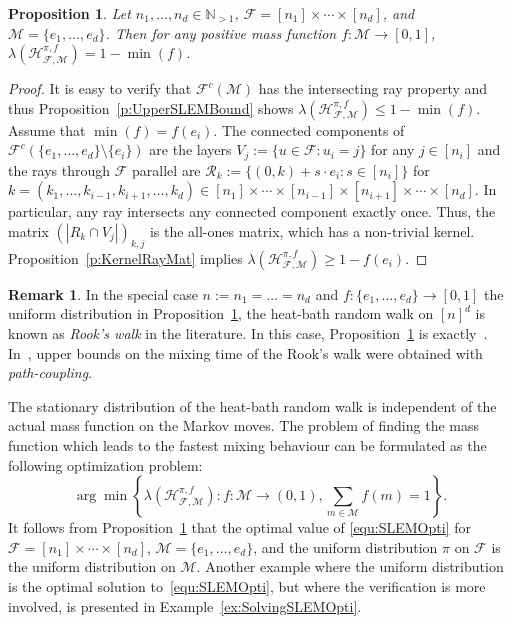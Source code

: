 \documentclass[11pt]{amsart}
\newtheorem{prop}[thm]{Proposition}
\theoremstyle{definition}
\newtheorem{remark}[thm]{Remark}
\numberwithin{equation}{section}
\newcommand{\ring}[1]{\ensuremath{\mathbb{#1}}}
\renewcommand{\>}{\rangle}
\newcommand{\<}{\langle}
\newcommand{\0}{\mathbf{0}}
\newcommand{\1}{\mathbf{1}}
\newcommand{\2}{\mathbf{2}}
\newcommand\NN{\ring{N}}
\newcommand\cF{{\mathcal F}}
\newcommand\cM{{\mathcal M}}
\newcommand\cR{{\mathcal R}}
\newcommand{\heatbath}[4]{\mathcal{H}^{#1,#2}_{#3,#4}}
\begin{document}
\begin{prop}\label{p:HeatBathOnHyperrectangle}
Let $n_1,\dots,n_d\in\NN_{>1}$,
$\cF=[n_1]\times\cdots\times[n_d]$, and
$\cM=\{e_1,\dots,e_d\}$. Then for any positive
mass function $f:\cM\to[0,1]$,
$\lambda(\heatbath{\pi}{f}{\cF}{\cM})=1-\min(f)$. 
\end{prop}
\begin{proof}
It is easy to verify that $\cF^c(\cM)$ has the intersecting ray property
and thus Proposition~\ref{p:UpperSLEMBound} shows
$\lambda(\heatbath{\pi}{f}{\cF}{\cM})\le 1-\min(f)$. Assume that
$\min(f)=f(e_i)$. The connected
components of $\cF^c(\{e_1,\dots,e_d\}\setminus\{e_i\})$ are the layers $V_j:=\{u\in
\cF: u_i=j\}$ for any $j\in[n_i]$ and the rays through $\cF$ parallel are
$\cR_{k}:=\{(0,k)+s\cdot e_i: s\in[n_i]\}$ for
$k=(k_1,\dots,k_{i-1},k_{i+1},\dots,k_d)\in[n_1]\times\cdots\times[n_{i-1}]\times[n_{i+1}]\times\cdots\times[n_d]$. In particular, any
ray intersects any connected component exactly once. Thus, the matrix
$(|R_k\cap V_j|)_{k,j}$ is the all-ones matrix, which has a
non-trivial kernel. Proposition~\ref{p:KernelRayMat} implies 
$\lambda(\heatbath{\pi}{f}{\cF}{\cM})\ge 1-f(e_i)$.
\end{proof}

\begin{remark}\label{r:RooksWalk}
In the special case $n:=n_1=\dots=n_d$ and
$f:\{e_1,\dots,e_d\}\to[0,1]$ the uniform distribution in
Proposition~\ref{p:HeatBathOnHyperrectangle}, the heat-bath
random walk on $[n]^d$ is known as \emph{Rook's walk} in the
literature. In this case, Proposition~\ref{p:HeatBathOnHyperrectangle}
is exactly~\cite[Proposition~2.3]{Kim2012}.
In~\cite{Mcleman2015}, upper bounds on the mixing time of the Rook's
walk were obtained with \emph{path-coupling}.
\end{remark}

The stationary distribution of the heat-bath random walk is
independent of the actual mass function on the Markov moves. 
The problem of finding the mass function which leads to the fastest
mixing behaviour can be formulated as the following optimization
problem:
\begin{equation}\label{equ:SLEMOpti}
\arg\min\left\{\lambda(\heatbath{\pi}{f}{\cF}{\cM}): f:\cM\to(0,1),
\sum_{m\in\cM}f(m)=1\right\}.
\end{equation}
It follows from
Proposition~\ref{p:HeatBathOnHyperrectangle} that the optimal value of
\eqref{equ:SLEMOpti} for $\cF=[n_1]\times\cdots\times[n_d]$,
$\cM=\{e_1,\dots,e_d\}$, and the uniform distribution $\pi$ on $\cF$
is the uniform distribution on $\cM$. Another example where the
uniform distribution is the optimal solution to~\eqref{equ:SLEMOpti},
but where the verification is more involved, is presented in
Example~\ref{ex:SolvingSLEMOpti}.
\end{document}
